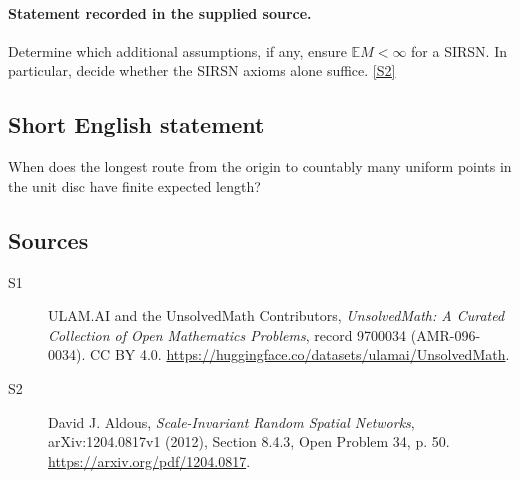 \documentclass[11pt]{article}
\newcommand{\sref}[2]{\hyperlink{source:#1:#2}{[S#2]}}
\begin{document}
\paragraph{Statement recorded in the supplied source.}
Determine which additional assumptions, if any, ensure $\mathbb E M<\infty$ for a SIRSN. In particular, decide whether the SIRSN axioms alone suffice. \sref{9700034}{2}
\subsection{Short English statement}
When does the longest route from the origin to countably many uniform points in the unit disc have finite expected length?
\subsection{Sources}
\begin{description}
\item[\hypertarget{source:9700034:1}{S1}] ULAM.AI and the UnsolvedMath Contributors, \emph{UnsolvedMath: A Curated Collection of Open Mathematics Problems}, record 9700034 (AMR-096-0034). CC BY 4.0. \url{https://huggingface.co/datasets/ulamai/UnsolvedMath}.
\item[\hypertarget{source:9700034:2}{S2}] David J. Aldous, \emph{Scale-Invariant Random Spatial Networks}, arXiv:1204.0817v1 (2012), Section 8.4.3, Open Problem 34, p. 50. \url{https://arxiv.org/pdf/1204.0817}.
\end{description}
\label{end:9700034}
\end{document}
